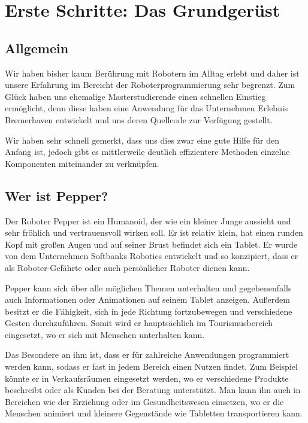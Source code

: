 \newcommand{\chaptergrundgeruest}{Kapitel 3. }

\chapter{Erste Schritte: Das Grundgerüst}
\label{sec:erste-schritte-und-installation}
\lhead{\chaptergrundgeruest \emph{Erste Schritte: Das Grundgerüst}}

\section{Allgemein}
Wir haben bisher kaum Berührung mit Robotern im Alltag erlebt und daher ist unsere Erfahrung im Bereicht der Roboterprogrammierung sehr begrenzt. Zum Glück haben uns ehemalige Masterstudierende einen schnellen Einstieg ermöglicht, denn diese haben eine Anwendung für das Unternehmen \grqq{}Erlebnis Bremerhaven\grqq{} entwickelt und uns deren Quellcode zur Verfügung gestellt.

Wir haben sehr schnell gemerkt, dass uns dies zwar eine gute Hilfe für den Anfang ist, jedoch gibt es mittlerweile deutlich effizientere Methoden einzelne Komponenten miteinander zu verknüpfen.\\

\section{Wer ist Pepper?}

Der Roboter Pepper ist ein Humanoid, der wie ein kleiner Junge aussieht und sehr fröhlich und vertrauensvoll wirken soll. Er ist relativ klein, hat einen runden Kopf mit großen Augen und auf seiner Brust befindet sich ein Tablet. Er wurde von dem Unternehmen Softbanks Robotics entwickelt und so konzipiert, dass er als Roboter-Gefährte oder auch persönlicher Roboter dienen kann.

Pepper kann sich über alle möglichen Themen unterhalten und gegebenenfalls auch Informationen oder Animationen auf seinem Tablet anzeigen. Außerdem besitzt er die Fähigkeit, sich in jede Richtung fortzubewegen und verschiedene Gesten durchzuführen. Somit wird er hauptsächlich im Tourismusbereich eingesetzt, wo er sich mit Menschen unterhalten kann.

Das Besondere an ihm ist, dass er für zahlreiche Anwendungen programmiert werden kann, sodass er fast in jedem Bereich einen Nutzen findet. Zum Beispiel könnte er in Verkaufsräumen eingesetzt werden, wo er verschiedene Produkte beschreibt oder als Kunden bei der Beratung unterstützt. Man kann ihn auch in Bereichen wie der Erziehung oder im Gesundheitswesen einsetzen, wo er die Menschen animiert und kleinere Gegenstände wie Tabletten transportieren kann.

